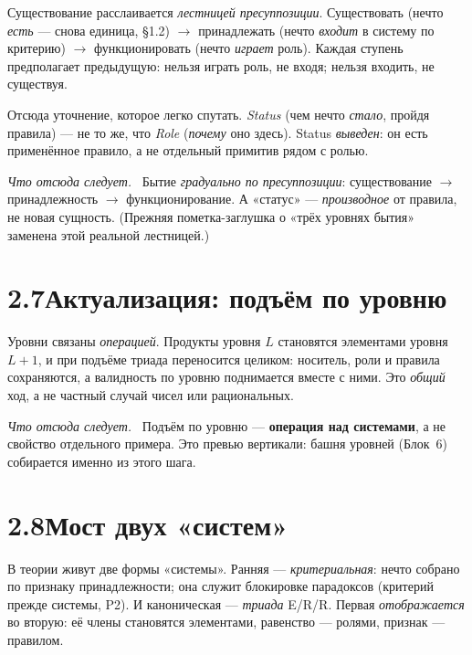 \documentclass[12pt,a4paper]{article}
\newcommand{\rezultat}{\medskip\noindent\emph{Что отсюда следует.}\ }
\begin{document}
Существование расслаивается \emph{лестницей пресуппозиции}. Существовать (нечто \emph{есть} --- снова
единица, §1.2) $\to$ принадлежать (нечто \emph{входит} в систему по критерию) $\to$ функционировать
(нечто \emph{играет} роль). Каждая ступень предполагает предыдущую: нельзя играть роль, не входя;
нельзя входить, не существуя.

Отсюда уточнение, которое легко спутать. \emph{Status} (чем нечто \emph{стало}, пройдя правила) ---
не то же, что \emph{Role} (\emph{почему} оно здесь). Status \emph{выведен}: он есть применённое
правило, а не отдельный примитив рядом с ролью.

\rezultat
Бытие \emph{градуально по пресуппозиции}: существование $\to$ принадлежность $\to$ функционирование.
А «статус» --- \emph{производное} от правила, не новая сущность. (Прежняя пометка-заглушка о «трёх
уровнях бытия» заменена этой реальной лестницей.)

\section*{2.7\quad Актуализация: подъём по уровню}

Уровни связаны \emph{операцией}. Продукты уровня $L$ становятся элементами уровня $L+1$, и при
подъёме триада переносится целиком: носитель, роли и правила сохраняются, а валидность по уровню
поднимается вместе с ними. Это \emph{общий} ход, а не частный случай чисел или рациональных.

\rezultat
Подъём по уровню --- \textbf{операция над системами}, а не свойство отдельного примера. Это
превью вертикали: башня уровней (Блок~6) собирается именно из этого шага.

\section*{2.8\quad Мост двух «систем»}

В теории живут две формы «системы». Ранняя --- \emph{критериальная}: нечто собрано по признаку
принадлежности; она служит блокировке парадоксов (критерий прежде системы, P2). И каноническая ---
\emph{триада} E/R/R. Первая \emph{отображается} во вторую: её члены становятся элементами, равенство
--- ролями, признак --- правилом.
\end{document}
